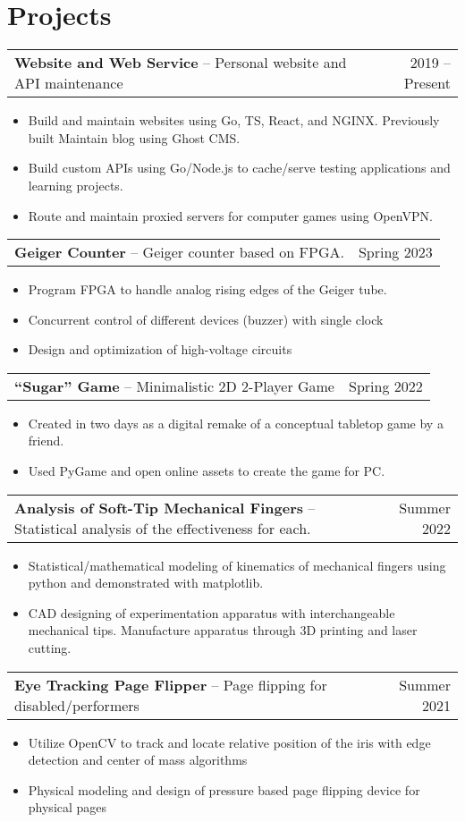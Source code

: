 \documentclass[oneside, 11pt]{article}
\newcommand*{\projectEntry}[3]{
	\noindent
	\begin{tabularx}{\textwidth}{Xr}
	\textbf{#1} -- #3 & #2
	\end{tabularx}
	\vspace{-1.25\baselineskip}
}
\newenvironment{expD}
	{\begin{itemize}[noitemsep,topsep=0pt]}
	{\end{itemize}}
\begin{document}
\section*{Projects}

\projectEntry{Website and Web Service}
	{2019 -- Present}
	{Personal website and API maintenance}

\begin{expD}
	\item Build and maintain websites using Go, TS, React, and NGINX. Previously built  Maintain blog using Ghost CMS.
	\item Build custom APIs using Go/Node.js to cache/serve testing applications and learning projects.
	\item Route and maintain proxied servers for computer games using OpenVPN.
\end{expD}

\projectEntry{Geiger Counter}
	{Spring 2023}
	{Geiger counter based on FPGA.}

\begin{expD}
	\item Program FPGA to handle analog rising edges of the Geiger tube.
	\item Concurrent control of different devices (buzzer) with single clock
	\item Design and optimization of high-voltage circuits
\end{expD}

\projectEntry{``Sugar'' Game}
	{Spring 2022}
	{Minimalistic 2D 2-Player Game}

\begin{expD}
	\item Created in two days as a digital remake of a conceptual tabletop game by a friend.
	\item Used PyGame and open online assets to create the game for PC.
\end{expD}

\projectEntry{Analysis of Soft-Tip Mechanical Fingers}
	{Summer 2022}
	{Statistical analysis of the effectiveness for each.}

\begin{expD}
	\item Statistical/mathematical modeling of kinematics of mechanical fingers using python and demonstrated with matplotlib.
	\item CAD designing of experimentation apparatus with interchangeable mechanical tips. Manufacture apparatus through 3D printing and laser cutting.
\end{expD}

\projectEntry{Eye Tracking Page Flipper}
	{Summer 2021}
	{Page flipping for disabled/performers}

\begin{expD}
	\item Utilize OpenCV to track and locate relative position of the iris with edge detection and center of mass algorithms
	\item Physical modeling and design of pressure based page flipping device for physical pages
\end{expD}
\end{document}
